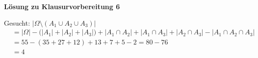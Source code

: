 \textbf{Lösung zu Klausurvorbereitung 6}

\begin{loesung}
Gesucht: $\left|\Omega \setminus (A_1 \cup A_2 \cup A_3)\right|$
\begin{align*}
&= |\Omega| - \bigl(|A_1| + |A_2| + |A_3|\bigr) + |A_1 \cap A_2| + |A_1 \cap A_3| + |A_2 \cap A_3| - |A_1 \cap A_2 \cap A_3|\\
&= 55 - (35 + 27 + 12) + 13 + 7 + 5 - 2 = 80 - 76\\
&= 4
\end{align*}
\end{loesung}
